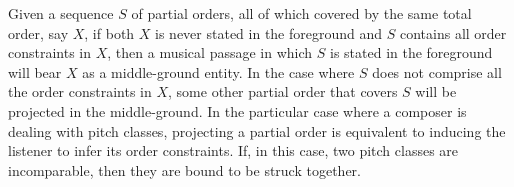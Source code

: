 \begin{example}
    \cite[197]{Starr1984}
    Given a sequence $S$ of partial orders, all of which covered by the same total order, say $X$, if both $X$ is never stated in the foreground and $S$ contains all order constraints in $X$, then a musical passage in which $S$ is stated in the foreground will bear $X$ as a middle-ground entity. In the case where $S$ does not comprise all the order constraints in $X$, some other partial order that covers $S$ will be projected in the middle-ground. In the particular case where a composer is dealing with pitch classes, projecting a partial order is equivalent to inducing the listener to infer its order constraints. If, in this case, two pitch classes are incomparable, then they are bound to be struck together.
\end{example}

